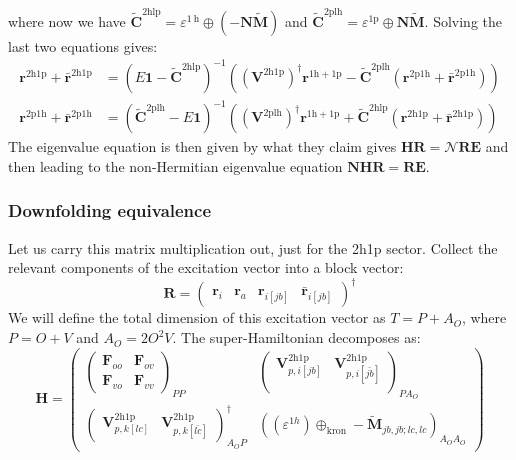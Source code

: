 where now we have $\bm{\tilde{C}}^{2\mathrm{hlp}} = \varepsilon^{1\mathrm{~h}} \oplus (-\bm{N}\bm{\tilde{M}})$ and $\bm{\tilde{C}}^{2\mathrm{plh}} = \varepsilon^{1\mathrm{p}} \oplus \bm{N}\bm{\tilde{M}}$.
Solving the last two equations gives:
\begin{align}
\bm{r}^{2\mathrm{h}1\mathrm{p}} + \bm{\bar{r}}^{2\mathrm{h}1\mathrm{p}} &= \left(E\bm{1} - \bm{\tilde{C}}^{2\mathrm{hlp}}\right)^{-1} \left(\left(\bm{V}^{2\mathrm{h}1\mathrm{p}}\right)^\dagger \bm{r}^{1\mathrm{h}+1\mathrm{p}} - \bm{\tilde{C}}^{2\mathrm{plh}} \left(\bm{r}^{2\mathrm{p}1\mathrm{h}} + \bm{\bar{r}}^{2\mathrm{p}1\mathrm{h}}\right)\right) \\[6pt]
\bm{r}^{2\mathrm{p}1\mathrm{h}} + \bm{\bar{r}}^{2\mathrm{p}1\mathrm{h}} &= \left(\bm{\tilde{C}}^{2\mathrm{plh}} - E \bm{1}\right)^{-1} \left(\left(\bm{V}^{2\mathrm{plh}}\right)^\dagger \bm{r}^{1\mathrm{h}+1\mathrm{p}} + \bm{\tilde{C}}^{2\mathrm{hlp}} \left(\bm{r}^{2\mathrm{h}1\mathrm{p}} + \bm{\bar{r}}^{2\mathrm{h}1\mathrm{p}}\right)\right)
\end{align}
 The eigenvalue equation is then given by
what they claim gives $\bm{H} \bm{R} = \bm{\mathcal{N}} \bm{R} \bm{E}$ and then leading to the non-Hermitian eigenvalue equation $\mathcal{\bm{N}} \bm{H} \bm{R} = \bm{R} \bm{E}$.
\subsubsection{Downfolding equivalence}
Let us carry this matrix multiplication out, just for the 2h1p sector. Collect the relevant components of the excitation vector into a block vector:
\[
\bm{R} = 
\begin{pmatrix}
\bm{r}_i &\bm{r}_a &
\bm{r}_{i[jb]} &
\bm{\bar{r}}_{i[jb]}
\end{pmatrix}^\dag
\]
We will define the total dimension of this excitation vector as $T=P+A_O$, where $P=O+V$ and $A_O=2O^2V$.
The super-Hamiltonian decomposes as:
\[
\bm{H} =
\begin{pmatrix}
\begin{pmatrix}
    \bm{F}_{oo} & \bm{F}_{ov} \\
    \bm{F}_{vo} & \bm{F}_{vv}
\end{pmatrix}_{PP} &
\begin{pmatrix}
    \bm{V}^{2 \mathrm{h1p}}_{p,i[jb]} & \bm{V}^{2 \mathrm{h1p}}_{p,i[\bar{jb}]} \\
\end{pmatrix}_{PA_O} \\ 
\begin{pmatrix}
    \bm{V}^{2 \mathrm{h1p}}_{p,k[lc]} & \bm{V}^{2 \mathrm{h1p}}_{p,k[\bar{lc}]}
\end{pmatrix}^\dagger_{A_OP} &
\left(\left(\varepsilon^{1h}\right) \oplus_{\text{kron}} -\bm{\tilde{M}}_{jb,jb;lc,lc}\right)_{A_OA_O}
\end{pmatrix}
\] 
